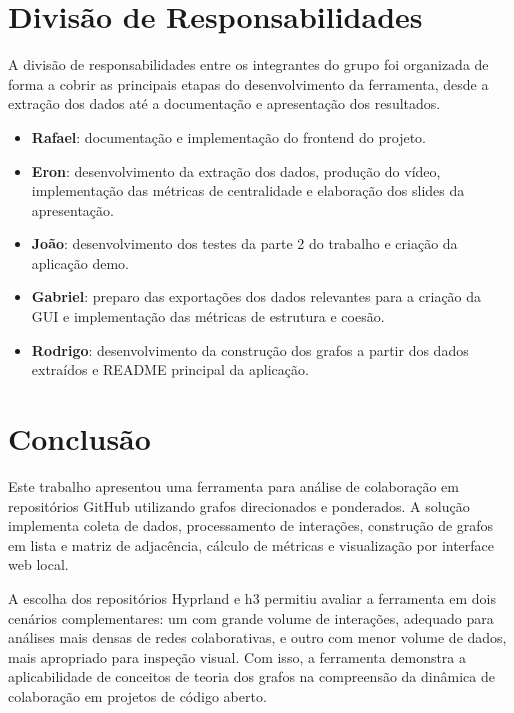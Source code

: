 \documentclass[12pt]{article}
\begin{document}
\section{Divisão de Responsabilidades}

A divisão de responsabilidades entre os integrantes do grupo foi organizada de
forma a cobrir as principais etapas do desenvolvimento da ferramenta, desde a
extração dos dados até a documentação e apresentação dos resultados.

\begin{itemize}
    \item \textbf{Rafael}: documentação e implementação do frontend do projeto.
    \item \textbf{Eron}: desenvolvimento da extração dos dados, produção do
    vídeo, implementação das métricas de centralidade e elaboração dos slides
    da apresentação.
    \item \textbf{João}: desenvolvimento dos testes da parte 2 do trabalho e
    criação da aplicação demo.
    \item \textbf{Gabriel}: preparo das exportações dos dados relevantes para a
    criação da GUI e implementação das métricas de estrutura e coesão.
    \item \textbf{Rodrigo}: desenvolvimento da construção dos grafos a partir
    dos dados extraídos e README principal da aplicação.
\end{itemize}

\section{Conclusão}

Este trabalho apresentou uma ferramenta para análise de colaboração em
repositórios GitHub utilizando grafos direcionados e ponderados. A solução
implementa coleta de dados, processamento de interações, construção de grafos em
lista e matriz de adjacência, cálculo de métricas e visualização por interface
web local.

A escolha dos repositórios Hyprland e h3 permitiu avaliar a ferramenta em dois
cenários complementares: um com grande volume de interações, adequado para
análises mais densas de redes colaborativas, e outro com menor volume de dados,
mais apropriado para inspeção visual. Com isso, a ferramenta demonstra a
aplicabilidade de conceitos de teoria dos grafos na compreensão da dinâmica de
colaboração em projetos de código aberto.



\end{document}
